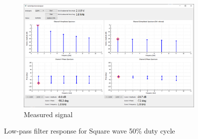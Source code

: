 \documentclass[notitlepage, a4paper, 11pt]{article}
\begin{document}
\begin{figure}[H]
\begin{subfigure}[][][t]{0.45\textwidth}
			\includegraphics[width=\textwidth, trim=10 80 10 100, clip]{../img/Circuit2/dut50}
			\caption{Measured signal}
		\end{subfigure}
		\caption{Low-pass filter response for Square wave 50\% duty cycle}
	\end{figure}
	
\end{document}
